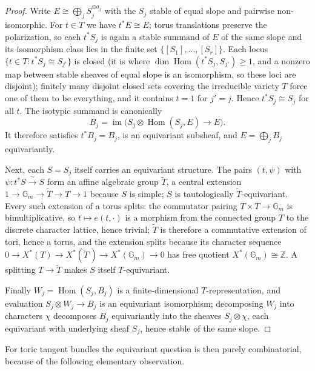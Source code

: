 \documentclass[11pt]{amsart}
\theoremstyle{definition}
\theoremstyle{remark}
\newcommand{\ZZ}{\mathbb{Z}}
\begin{document}
\begin{proof}
Write $E \cong \bigoplus_j S_j^{\oplus a_j}$ with the $S_j$ stable of
equal slope and pairwise non-isomorphic. For $t \in T$ we have
$t^* E \cong E$; torus translations preserve the polarization, so each
$t^* S_j$ is again a stable summand of $E$ of the same slope and
its isomorphism class lies in the finite set $\{[S_1], \dots, [S_r]\}$.
Each locus $\{t \in T : t^*S_j \cong S_{j'}\}$ is closed (it is where
$\dim \operatorname{Hom}(t^*S_j, S_{j'}) \ge 1$, and a nonzero map
between stable sheaves of equal slope is an isomorphism, so these loci
are disjoint); finitely many disjoint closed sets covering the
irreducible variety $T$ force one of them to be everything, and it
contains $t = 1$ for $j' = j$. Hence $t^* S_j \cong S_j$ for all $t$.
The isotypic summand is canonically
\[
B_j=\operatorname{im}\bigl(S_j\otimes
\operatorname{Hom}(S_j,E)\longrightarrow E\bigr).
\]
It therefore satisfies $t^* B_j=B_j$, is an equivariant subsheaf, and
$E = \bigoplus_j B_j$ equivariantly.

Next, each $S = S_j$ itself carries an equivariant structure. The pairs
$(t, \psi)$ with $\psi \colon t^* S \xrightarrow{\ \sim\ } S$ form
an affine algebraic group $\widetilde{T}$, a central extension
$1 \to \mathbb{G}_m \to \widetilde{T} \to T \to 1$ because $S$ is simple;
$S$ is tautologically $\widetilde{T}$-equivariant. Every such extension
of a torus splits: the commutator pairing $T \times T \to \mathbb{G}_m$
is bimultiplicative, so $t \mapsto e(t, \cdot)$ is a morphism from the
connected group $T$ to the discrete character lattice, hence trivial;
$\widetilde{T}$ is therefore a commutative extension of tori, hence a torus,
and the extension splits because its
character sequence
$0 \to X^*(T) \to X^*(\widetilde{T}\,) \to X^*(\mathbb{G}_m) \to 0$
has free quotient $X^*(\mathbb{G}_m) \cong \ZZ$. A splitting $T \to \widetilde{T}$ makes $S$ itself
$T$-equivariant.

Finally $W_j = \operatorname{Hom}(S_j, B_j)$ is a finite-dimensional
$T$-representation, and evaluation
$S_j \otimes W_j \to B_j$ is an equivariant isomorphism; decomposing
$W_j$ into characters $\chi$ decomposes $B_j$ equivariantly into the
sheaves $S_j \otimes \chi$, each equivariant with underlying sheaf
$S_j$, hence stable of the same slope.
\end{proof}

For toric tangent bundles the equivariant question is then purely
combinatorial, because of the following elementary observation.
\end{document}
